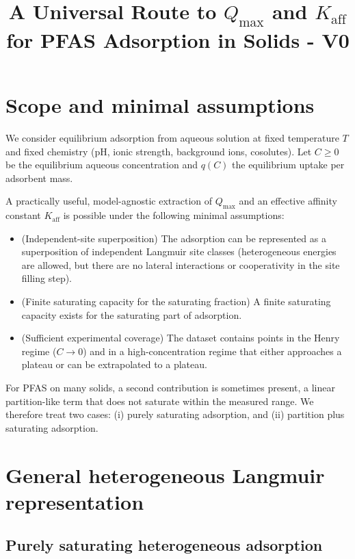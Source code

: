 \documentclass[12pt]{article}
\begin{document}
	
	\title{A Universal Route to $Q_{\max}$ and $K_{\mathrm{aff}}$ for PFAS Adsorption in Solids - V0}
	\author{}
	\date{}
	\maketitle
	
	\section{Scope and minimal assumptions}
	
	We consider equilibrium adsorption from aqueous solution at fixed temperature $T$ and fixed chemistry (pH, ionic strength, background ions, cosolutes). Let $C \ge 0$ be the equilibrium aqueous concentration and $q(C)$ the equilibrium uptake per adsorbent mass.
	
	A practically useful, model-agnostic extraction of $Q_{\max}$ and an effective affinity constant $K_{\mathrm{aff}}$ is possible under the following minimal assumptions:
	
	\begin{itemize}
		\item[A1.] (Independent-site superposition) The adsorption can be represented as a superposition of independent Langmuir site classes (heterogeneous energies are allowed, but there are no lateral interactions or cooperativity in the site filling step).
		\item[A2.] (Finite saturating capacity for the saturating fraction) A finite saturating capacity exists for the saturating part of adsorption.
		\item[A3.] (Sufficient experimental coverage) The dataset contains points in the Henry regime ($C \to 0$) and in a high-concentration regime that either approaches a plateau or can be extrapolated to a plateau.
	\end{itemize}
	
	For PFAS on many solids, a second contribution is sometimes present, a linear partition-like term that does not saturate within the measured range. We therefore treat two cases:
	(i) purely saturating adsorption, and (ii) partition plus saturating adsorption.
	
	\section{General heterogeneous Langmuir representation}
	
	\subsection{Purely saturating heterogeneous adsorption}
	
\end{document}
